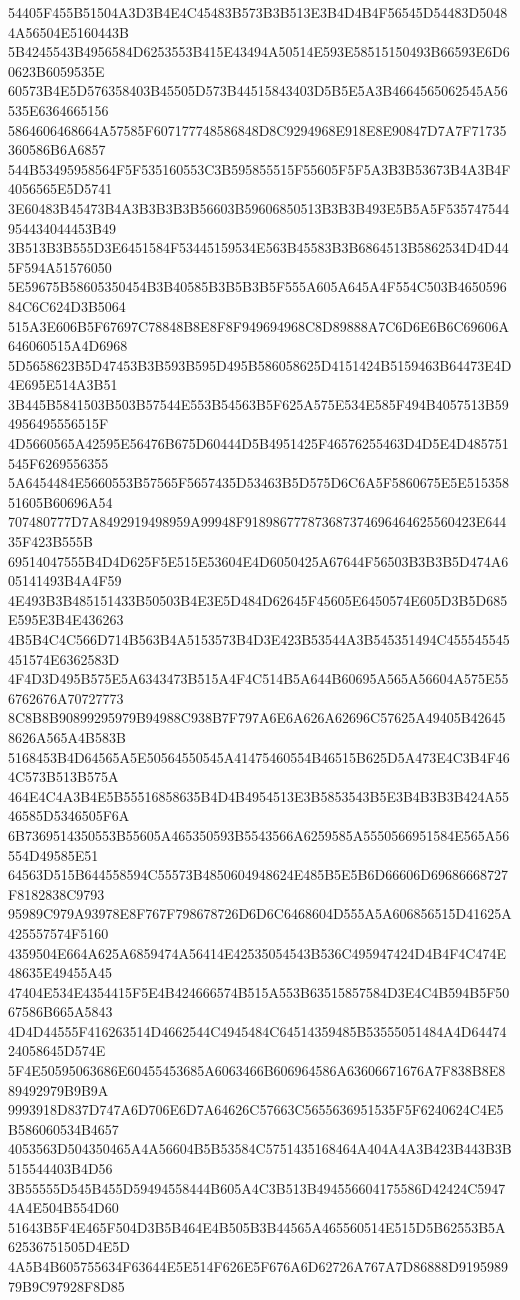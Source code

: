 {{{{{{{{{{{{{{{{{{{{{54405F455B51504A3D3B4E4C45483B573B3B513E3B4D4B4F56545D54483D50484A56504E5160443B
5B4245543B4956584D6253553B415E43494A50514E593E58515150493B66593E6D60623B6059535E
60573B4E5D576358403B45505D573B44515843403D5B5E5A3B4664565062545A56535E6364665156
5864606468664A57585F607177748586848D8C9294968E918E8E90847D7A7F71735360586B6A6857
544B53495958564F5F535160553C3B595855515F55605F5F5A3B3B53673B4A3B4F4056565E5D5741
3E60483B45473B4A3B3B3B3B56603B59606850513B3B3B493E5B5A5F535747544954434044453B49
3B513B3B555D3E6451584F53445159534E563B45583B3B6864513B5862534D4D445F594A51576050
5E59675B58605350454B3B40585B3B5B3B5F555A605A645A4F554C503B465059684C6C624D3B5064
515A3E606B5F67697C78848B8E8F8F949694968C8D89888A7C6D6E6B6C69606A646060515A4D6968
5D5658623B5D47453B3B593B595D495B586058625D4151424B5159463B64473E4D4E695E514A3B51
3B445B5841503B503B57544E553B54563B5F625A575E534E585F494B4057513B594956495556515F
4D5660565A42595E56476B675D60444D5B4951425F46576255463D4D5E4D485751545F6269556355
5A6454484E5660553B57565F5657435D53463B5D575D6C6A5F5860675E5E51535851605B60696A54
707480777D7A8492919498959A99948F918986777873687374696464625560423E64435F423B555B
69514047555B4D4D625F5E515E53604E4D6050425A67644F56503B3B3B5D474A605141493B4A4F59
4E493B3B485151433B50503B4E3E5D484D62645F45605E6450574E605D3B5D685E595E3B4E436263
4B5B4C4C566D714B563B4A5153573B4D3E423B53544A3B545351494C455545545451574E6362583D
4F4D3D495B575E5A6343473B515A4F4C514B5A644B60695A565A56604A575E556762676A70727773
8C8B8B90899295979B94988C938B7F797A6E6A626A62696C57625A49405B426458626A565A4B583B
5168453B4D64565A5E50564550545A41475460554B46515B625D5A473E4C3B4F464C573B513B575A
464E4C4A3B4E5B55516858635B4D4B4954513E3B5853543B5E3B4B3B3B424A5546585D5346505F6A
6B7369514350553B55605A465350593B5543566A6259585A5550566951584E565A56554D49585E51
64563D515B644558594C55573B4850604948624E485B5E5B6D66606D69686668727F8182838C9793
95989C979A93978E8F767F798678726D6D6C6468604D555A5A606856515D41625A425557574F5160
4359504E664A625A6859474A56414E42535054543B536C495947424D4B4F4C474E48635E49455A45
47404E534E4354415F5E4B424666574B515A553B63515857584D3E4C4B594B5F5067586B665A5843
4D4D44555F416263514D4662544C4945484C64514359485B53555051484A4D6447424058645D574E
5F4E50595063686E60455453685A6063466B606964586A63606671676A7F838B8E889492979B9B9A
9993918D837D747A6D706E6D7A64626C57663C5655636951535F5F6240624C4E5B586060534B4657
4053563D504350465A4A56604B5B53584C5751435168464A404A4A3B423B443B3B515544403B4D56
3B55555D545B455D59494558444B605A4C3B513B494556604175586D42424C59474A4E504B554D60
51643B5F4E465F504D3B5B464E4B505B3B44565A465560514E515D5B62553B5A62536751505D4E5D
4A5B4B605755634F63644E5E514F626E5F676A6D62726A767A7D86888D919598979B9C97928F8D85
}}}}}}}}}}}}}}}}}}}}}
